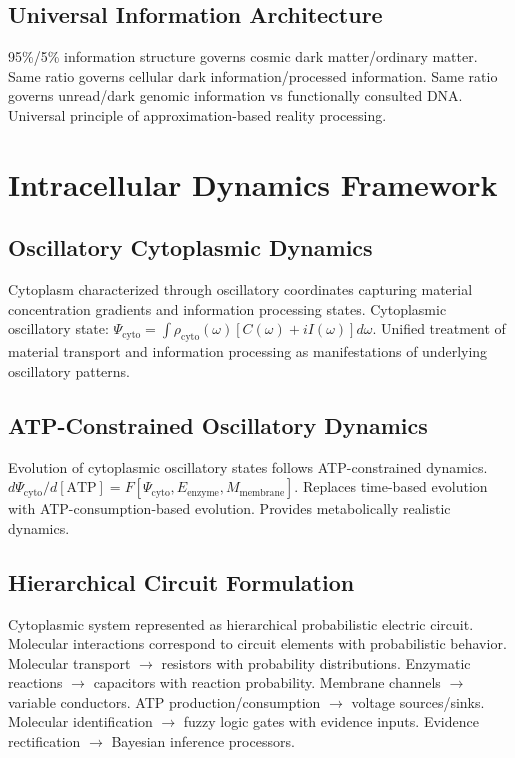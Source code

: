 \documentclass[12pt,a4paper]{article}
\begin{document}
\subsection{Universal Information Architecture}

95\%/5\% information structure governs cosmic dark matter/ordinary matter. Same ratio governs cellular dark information/processed information. Same ratio governs unread/dark genomic information vs functionally consulted DNA. Universal principle of approximation-based reality processing.

\section{Intracellular Dynamics Framework}

\subsection{Oscillatory Cytoplasmic Dynamics}

Cytoplasm characterized through oscillatory coordinates capturing material concentration gradients and information processing states. Cytoplasmic oscillatory state: $\Psi_{\text{cyto}} = \int \rho_{\text{cyto}}(\omega) [C(\omega) + iI(\omega)] d\omega$. Unified treatment of material transport and information processing as manifestations of underlying oscillatory patterns.

\subsection{ATP-Constrained Oscillatory Dynamics}

Evolution of cytoplasmic oscillatory states follows ATP-constrained dynamics. $d\Psi_{\text{cyto}}/d[\text{ATP}] = F[\Psi_{\text{cyto}}, E_{\text{enzyme}}, M_{\text{membrane}}]$. Replaces time-based evolution with ATP-consumption-based evolution. Provides metabolically realistic dynamics.

\subsection{Hierarchical Circuit Formulation}

Cytoplasmic system represented as hierarchical probabilistic electric circuit. Molecular interactions correspond to circuit elements with probabilistic behavior. Molecular transport $\to$ resistors with probability distributions. Enzymatic reactions $\to$ capacitors with reaction probability. Membrane channels $\to$ variable conductors. ATP production/consumption $\to$ voltage sources/sinks. Molecular identification $\to$ fuzzy logic gates with evidence inputs. Evidence rectification $\to$ Bayesian inference processors.
\end{document}
